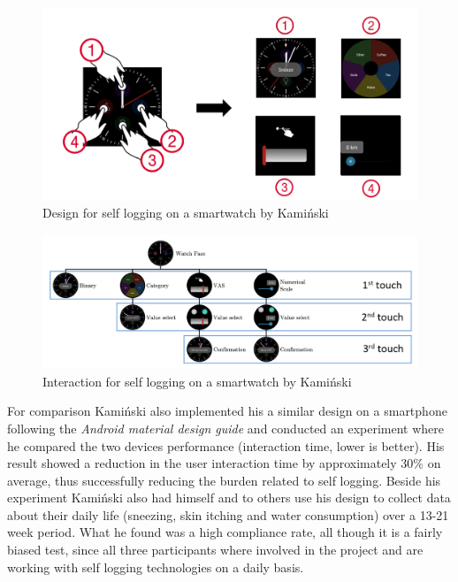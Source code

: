 \begin{figure}[h!]
    \centering
    \includegraphics[width=1\textwidth]{figures/tomas_design.png}
    \caption{Design for self logging on a smartwatch by Kami\'nski\cite{tomas}}
    \label{tomas_design}
\end{figure}

\begin{figure}[h!]
    \centering
    \includegraphics[width=1\textwidth]{figures/tomas_design2.png}
    \caption{Interaction for self logging on a smartwatch by Kami\'nski\cite{tomas}}
    \label{tomas_design2}
\end{figure}

For comparison Kami\'nski also implemented his a similar design on a smartphone following the \emph{Android material design guide}\cite{android_design} and conducted an experiment where he compared the two devices performance (interaction time, lower is better). His result showed a reduction in the user interaction time by approximately 30\% on average, thus successfully reducing the burden related to self logging. Beside his experiment Kami\'nski also had himself and to others use his design to collect data about their daily life (sneezing, skin itching and water consumption) over a 13-21 week period. What he found was a high compliance rate, all though it is a fairly biased test, since all three participants where involved in the project and are working with self logging technologies on a daily basis. 

